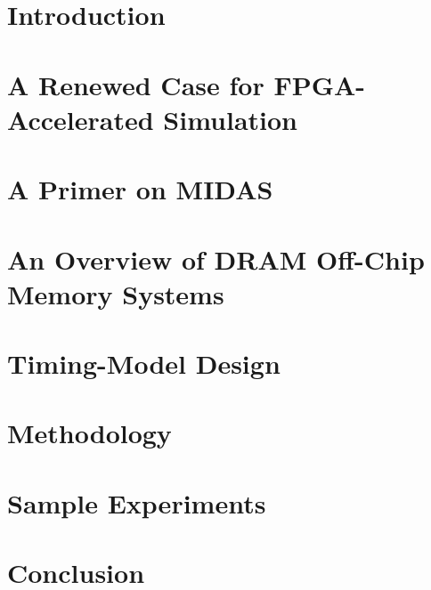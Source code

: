 \documentclass[masters]{ucbthesis}
\begin{document}
\chapter{Introduction}


\chapter{A Renewed Case for FPGA-Accelerated Simulation}


\chapter{A Primer on MIDAS}


\chapter{An Overview of DRAM Off-Chip Memory Systems}


\chapter{Timing-Model Design}


\chapter{Methodology}


\chapter{Sample Experiments}


\chapter{Conclusion}


\printbibliography
\end{document}
